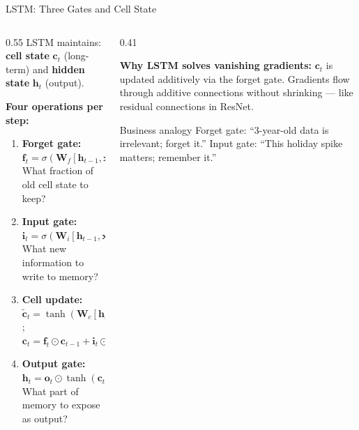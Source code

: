 \documentclass[aspectratio=169, 11pt]{beamer}
\begin{document}

\begin{frame}{LSTM: Three Gates and Cell State}
  \begin{columns}[T]
    \begin{column}{0.55\textwidth}
      LSTM maintains: \textbf{cell state} $\mathbf{c}_t$ (long-term) and
      \textbf{hidden state} $\mathbf{h}_t$ (output).

      \vspace{0.1cm}
      \textbf{Four operations per step:}
      \begin{enumerate}\footnotesize
        \item \textbf{Forget gate:} $\mathbf{f}_t = \sigma(\mathbf{W}_f[\mathbf{h}_{t-1}, \mathbf{x}_t] + \mathbf{b}_f)$\\
              What fraction of old cell state to keep?
        \item \textbf{Input gate:} $\mathbf{i}_t = \sigma(\mathbf{W}_i[\mathbf{h}_{t-1}, \mathbf{x}_t] + \mathbf{b}_i)$\\
              What new information to write to memory?
        \item \textbf{Cell update:} $\tilde{\mathbf{c}}_t = \tanh(\mathbf{W}_c[\mathbf{h}_{t-1}, \mathbf{x}_t] + \mathbf{b}_c)$;
              $\mathbf{c}_t = \mathbf{f}_t \odot \mathbf{c}_{t-1} + \mathbf{i}_t \odot \tilde{\mathbf{c}}_t$
        \item \textbf{Output gate:} $\mathbf{h}_t = \mathbf{o}_t \odot \tanh(\mathbf{c}_t)$\\
              What part of memory to expose as output?
      \end{enumerate}
    \end{column}
    \begin{column}{0.41\textwidth}
      \begin{keybox}
        \small\textbf{Why LSTM solves vanishing gradients:}
        $\mathbf{c}_t$ is updated additively via the forget gate.
        Gradients flow through additive connections without
        shrinking --- like residual connections in ResNet.
      \end{keybox}
      \vspace{0.1cm}
      \begin{examplebox}{Business analogy}
        \small Forget gate: ``3-year-old data is irrelevant; forget it.''
        Input gate: ``This holiday spike matters; remember it.''
      \end{examplebox}
    \end{column}
  \end{columns}
\end{frame}
\end{document}
